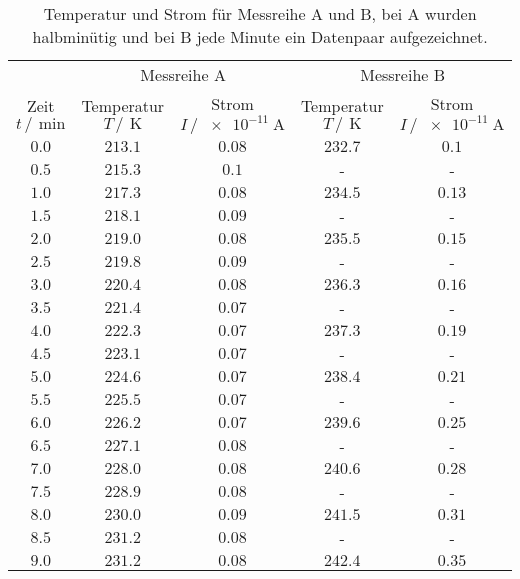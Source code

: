 \newpage
\begin{table}
    \centering
    \caption{Temperatur und Strom für Messreihe A und B, bei A wurden halbminütig und bei B jede Minute ein Datenpaar aufgezeichnet.}
    \label{tab:Messdaten_roh}
    \begin{tabular}{c c c c c}
        \toprule
        &\multicolumn{2}{c}{Messreihe A}&\multicolumn{2}{c}{Messreihe B}\\
        Zeit $t \,/\,\SI{}{\minute}$&Temperatur $T \,/\,\SI{}{\kelvin}$ &Strom $I \,/\,\SI{e-11}{\ampere}$&Temperatur $T \,/\,\SI{}{\kelvin}$ &Strom $I \,/\,\SI{e-11}{\ampere}$\\
        \midrule
        $\num{0.0}$&$\num{213.1}$&$\num{0.08}$&$\num{232.7}$&$\num{0.1}$\\
        $\num{0.5}$&$\num{215.3}$&$\num{0.1}$&-&-\\
        $\num{1.0}$&$\num{217.3}$&$\num{0.08}$&$\num{234.5}$&$\num{0.13}$\\
        $\num{1.5}$&$\num{218.1}$&$\num{0.09}$&-&-\\
        $\num{2.0}$&$\num{219.0}$&$\num{0.08}$&$\num{235.5}$&$\num{0.15}$\\
        $\num{2.5}$&$\num{219.8}$&$\num{0.09}$&-&-\\
        $\num{3.0}$&$\num{220.4}$&$\num{0.08}$&$\num{236.3}$&$\num{0.16}$\\
        $\num{3.5}$&$\num{221.4}$&$\num{0.07}$&-&-\\
        $\num{4.0}$&$\num{222.3}$&$\num{0.07}$&$\num{237.3}$&$\num{0.19}$\\
        $\num{4.5}$&$\num{223.1}$&$\num{0.07}$&-&-\\
        $\num{5.0}$&$\num{224.6}$&$\num{0.07}$&$\num{238.4}$&$\num{0.21}$\\
        $\num{5.5}$&$\num{225.5}$&$\num{0.07}$&-&-\\
        $\num{6.0}$&$\num{226.2}$&$\num{0.07}$&$\num{239.6}$&$\num{0.25}$\\
        $\num{6.5}$&$\num{227.1}$&$\num{0.08}$&-&-\\
        $\num{7.0}$&$\num{228.0}$&$\num{0.08}$&$\num{240.6}$&$\num{0.28}$\\
        $\num{7.5}$&$\num{228.9}$&$\num{0.08}$&-&-\\
        $\num{8.0}$&$\num{230.0}$&$\num{0.09}$&$\num{241.5}$&$\num{0.31}$\\
        $\num{8.5}$&$\num{231.2}$&$\num{0.08}$&-&-\\
        $\num{9.0}$&$\num{231.2}$&$\num{0.08}$&$\num{242.4}$&$\num{0.35}$\\

\end{tabular}
\end{table}
